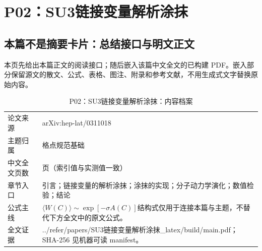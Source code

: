 \documentclass[UTF8,11pt,oneside]{ctexbook}
\begin{document}
\chapter{P02：SU3链接变量解析涂抹}
\section*{本篇不是摘要卡片：总结接口与明文正文}
本页先给出本篇正文的阅读接口；随后嵌入该篇中文全文的已构建 PDF。嵌入部分保留源文的散文、公式、表格、图注、附录和参考文献，不用生成式文字替换原始内容。
\begin{table}[htbp]
  \centering
  \caption{P02：SU3链接变量解析涂抹：内容档案}
  \small
  \begin{tabularx}{0.96\textwidth}{@{}p{3.3cm}>{\raggedright\arraybackslash}X@{}}
    \toprule
    论文来源 & arXiv:hep-lat/0311018 \\
    主题归属 & 格点规范基础 \\
    中文全文页数 & 12 页（索引值与实测值一致） \\
    章节入口 & 引言；链接变量的解析涂抹；涂抹的实现；分子动力学演化；数值检验；结论 \\
    公式主线 & $\langle W(C)\rangle\sim\exp[-\sigma A(C)]$\newline\scriptsize 结构式仅用于连接本篇与主题，不替代下方全文中的原文公式。 \\
    全文证据 & ../\allowbreak{}refer/\allowbreak{}papers/\allowbreak{}SU3链接变量解析涂抹\_\allowbreak{}latex/\allowbreak{}build/\allowbreak{}main.pdf；SHA-256 见机器可读 manifest。 \\
    \bottomrule
  \end{tabularx}
\end{table}
\end{document}
